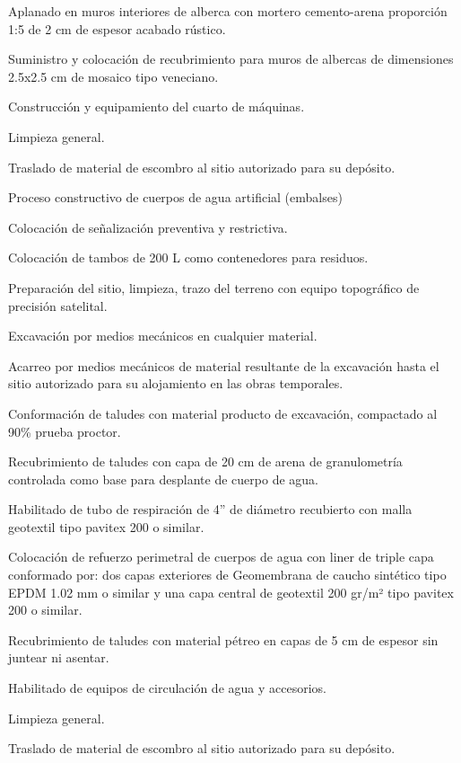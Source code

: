 \documentclass{article}
\begin{document}
Aplanado en muros interiores de alberca con mortero cemento-arena proporción 1:5 de 2 cm de espesor acabado rústico.

Suministro y colocación de recubrimiento para muros de albercas de dimensiones 2.5x2.5 cm de mosaico tipo veneciano.

Construcción y equipamiento del cuarto de máquinas.

Limpieza general.

Traslado de material de escombro al sitio autorizado para su depósito.


\bigskip


\bigskip

Proceso constructivo de cuerpos de agua artificial (embalses)


\bigskip

Colocación de señalización preventiva y restrictiva.

Colocación de tambos de 200 L como contenedores para residuos.

Preparación del sitio, limpieza, trazo del terreno con equipo topográfico de precisión satelital.

Excavación por medios mecánicos en cualquier material.

Acarreo por medios mecánicos de material resultante de la excavación hasta el sitio autorizado para su alojamiento en las obras temporales.

Conformación de taludes con material producto de excavación, compactado al 90\% prueba proctor.

Recubrimiento de taludes con capa de 20 cm de arena de granulometría controlada como base para desplante de cuerpo de agua.

Habilitado de tubo de respiración de 4” de diámetro recubierto con malla geotextil tipo pavitex 200 o similar.

Colocación de refuerzo perimetral de cuerpos de agua con liner de triple capa conformado por: dos capas exteriores de Geomembrana de caucho sintético tipo EPDM 1.02 mm o similar y una capa central de geotextil 200 gr/m² tipo pavitex 200 o similar.

Recubrimiento de taludes con material pétreo en capas de 5 cm de espesor sin juntear ni asentar.

Habilitado de equipos de circulación de agua y accesorios.

Limpieza general.

Traslado de material de escombro al sitio autorizado para su depósito.
\end{document}
